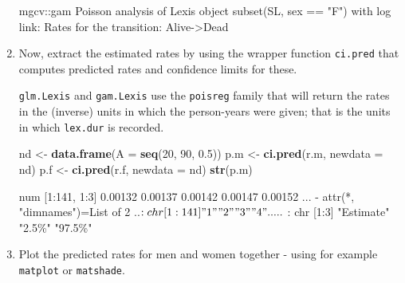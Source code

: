 \documentclass[
]{book}
\newenvironment{Shaded}{\begin{snugshade}}{\end{snugshade}}
\newcommand{\AttributeTok}[1]{\textcolor[rgb]{0.13,0.29,0.53}{#1}}
\newcommand{\DecValTok}[1]{\textcolor[rgb]{0.00,0.00,0.81}{#1}}
\newcommand{\FloatTok}[1]{\textcolor[rgb]{0.00,0.00,0.81}{#1}}
\newcommand{\FunctionTok}[1]{\textcolor[rgb]{0.13,0.29,0.53}{\textbf{#1}}}
\newcommand{\NormalTok}[1]{#1}
\newcommand{\OtherTok}[1]{\textcolor[rgb]{0.56,0.35,0.01}{#1}}
\begin{document}
\begin{enumerate}
\begin{Shaded}
\begin{Highlighting}[]
\NormalTok{mgcv::gam Poisson analysis of Lexis object subset(SL, sex == "F") with log link:}
\NormalTok{Rates for the transition:}
\NormalTok{Alive{-}\textgreater{}Dead}
\end{Highlighting}
\end{Shaded}
\item
  Now, extract the estimated rates by using the wrapper function
  \texttt{ci.pred} that computes predicted rates and confidence
  limits for these.

  \texttt{glm.Lexis} and \texttt{gam.Lexis} use the \texttt{poisreg} family that will return
  the rates in the (inverse) units in which the person-years were
  given; that is the units in which \texttt{lex.dur} is recorded.

\begin{Shaded}
\begin{Highlighting}[]
\NormalTok{nd }\OtherTok{\textless{}{-}} \FunctionTok{data.frame}\NormalTok{(}\AttributeTok{A =} \FunctionTok{seq}\NormalTok{(}\DecValTok{20}\NormalTok{, }\DecValTok{90}\NormalTok{, }\FloatTok{0.5}\NormalTok{))}
\NormalTok{p.m }\OtherTok{\textless{}{-}} \FunctionTok{ci.pred}\NormalTok{(r.m, }\AttributeTok{newdata =}\NormalTok{ nd)}
\NormalTok{p.f }\OtherTok{\textless{}{-}} \FunctionTok{ci.pred}\NormalTok{(r.f, }\AttributeTok{newdata =}\NormalTok{ nd)}
\FunctionTok{str}\NormalTok{(p.m)}
\end{Highlighting}
\end{Shaded}

\begin{Shaded}
\begin{Highlighting}[]
\NormalTok{ num [1:141, 1:3] 0.00132 0.00137 0.00142 0.00147 0.00152 ...}
\NormalTok{ {-} attr(*, "dimnames")=List of 2}
\NormalTok{  ..$ : chr [1:141] "1" "2" "3" "4" ...}
\NormalTok{  ..$ : chr [1:3] "Estimate" "2.5\%" "97.5\%"}
\end{Highlighting}
\end{Shaded}
\item
  Plot the predicted rates for men and women together - using for
  example \texttt{matplot} or \texttt{matshade}.


\end{enumerate}
\end{document}
